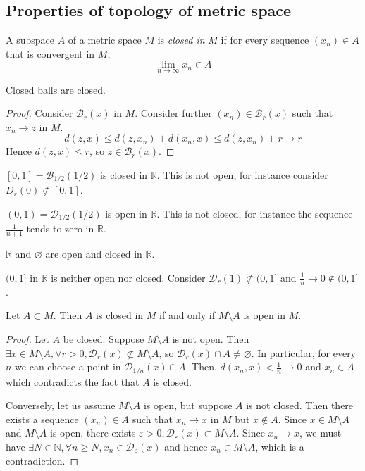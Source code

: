 \subsection{Properties of topology of metric space}
\begin{definition}
	A subspace \( A \) of a metric space \( M \) is \textit{closed in} \( M \) if for every sequence \( (x_n) \in A \) that is convergent in \( M \),
	\[
		\lim_{n \to \infty} x_n \in A
	\]
\end{definition}
\begin{lemma}
	Closed balls are closed.
\end{lemma}
\begin{proof}
	Consider \( \mathcal B_r(x) \) in \( M \).
	Consider further \( (x_n) \in \mathcal B_r(x) \) such that \( x_n \to z \) in \( M \).
	\[
		d(z,x) \leq d(z,x_n) + d(x_n,x) \leq d(z,x_n) + r \to r
	\]
	Hence \( d(z,x) \leq r \), so \( z \in \mathcal B_r(x) \).
\end{proof}
\begin{example}
	\( [0,1] = \mathcal B_{1/2}(1/2) \) is closed in \( \mathbb R \).
	This is not open, for instance consider \( D_r(0) \not\subset [0,1] \).
\end{example}
\begin{example}
	\( (0,1) = \mathcal D_{1/2}(1/2) \) is open in \( \mathbb R \).
	This is not closed, for instance the sequence \( \frac{1}{n+1} \) tends to zero in \( \mathbb R \).
\end{example}
\begin{example}
	\( \mathbb R \) and \( \varnothing \) are open and closed in \( \mathbb R \).
\end{example}
\begin{example}
	\( (0,1] \) in \( \mathbb R \) is neither open nor closed.
	Consider \( \mathcal D_r(1) \not\subset (0,1] \) and \( \frac{1}{n} \to 0 \not\in (0,1] \).
\end{example}
\begin{lemma}
	Let \( A \subset M \).
	Then \( A \) is closed in \( M \) if and only if \( M \setminus A \) is open in \( M \).
\end{lemma}
\begin{proof}
	Let \( A \) be closed.
	Suppose \( M \setminus A \) is not open.
	Then \( \exists x \in M \setminus A, \forall r > 0, \mathcal D_r(x) \not\subset M \setminus A \), so \( \mathcal D_r(x) \cap A \neq \varnothing \).
	In particular, for every \( n \) we can choose a point in \( \mathcal D_{1/n}(x) \cap A \).
	Then, \( d(x_n,x) < \frac{1}{n} \to 0 \) and \( x_n \in A \) which contradicts the fact that \( A \) is closed.

	Conversely, let us assume \( M \setminus A \) is open, but suppose \( A \) is not closed.
	Then there exists a sequence \( (x_n) \in A \) such that \( x_n \to x \) in \( M \) but \( x \not\in A \).
	Since \( x \in M \setminus A \) and \( M \setminus A \) is open, there exists \( \varepsilon > 0, \mathcal D_\varepsilon(x) \subset M \setminus A \).
	Since \( x_n \to x \), we must have \( \exists N \in \mathbb N, \forall n \geq N, x_n \in \mathcal D_\varepsilon(x) \) and hence \( x_n \in M \setminus A \), which is a contradiction.
\end{proof}
